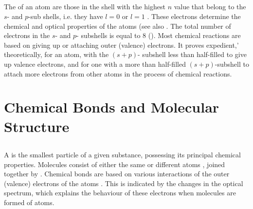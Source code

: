 \subsection{}\label{39.3.9} The  of an atom are those in the shell with the highest $n$ value that belong to the $s$- and $p$-sub shells, i.e. they have $l = 0$ or $l = 1$ . These electrons
determine the chemical and optical properties of the atoms (see also . The total number of electrons in the $s$- and $p$- subshells is equal to 8 (). Most chemical reactions are based on giving up or attaching outer (valence) electrons. It proves expedient,' theoretically, for an atom, with the $(s + p)$- subshell less than half-filled to give up valence electrons, and for one with a more than half-filled $(s + p)$-subshell to attach more electrons from other atoms in the process of chemical reactions.

\section{Chemical Bonds and Molecular Structure}
\label{sec-39.4} 

\subsection{}\label{39.4.1} A  is the smallest particle of a given substance, possessing its principal chemical properties. Molecules consist of either the same or different atoms , joined together by
. Chemical bonds are based on various interactions of the outer (valence) electrons of the atoms . This is indicated by the changes in the optical spectrum, which explains the behaviour of these electrons when molecules are formed of atoms.

